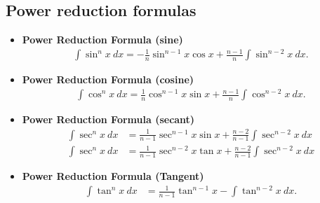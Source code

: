 \documentclass{report}
\begin{document}
    \bigbreak \noindent 
    \subsection*{Power reduction formulas}
    \bigbreak \noindent 
    \begin{thrm}
        \begin{itemize}
            \item \textbf{Power Reduction Formula (sine)}
                \begin{align*}
                    \int \sin^{n}{x}\ dx = -\frac{1}{n}\sin^{n-1}{x}\cos{x} + \frac{n-1}{n}\int \sin^{n-2}{x}\ dx
                .\end{align*}
            \item \textbf{Power Reduction Formula (cosine)}
                \begin{align*}
                    \int \cos^{n}{x}\ dx = \frac{1}{n}\cos^{n-1}{x}\sin{x} + \frac{n-1}{n}\int \cos^{n-2}{x}\ dx
                .\end{align*}
            \item \textbf{Power Reduction Formula (secant)}
            \begin{align*}
                \int \sec^{n}{x}\ dx &= \frac{1}{n-1}\sec^{n-1}{x}\sin{x}+\frac{n-2}{n-1}\int \sec^{n-2}{x}\ dx \\
                \int \sec^{n}{x}\ dx &= \frac{1}{n-1}\sec^{n-2}{x}\tan{x}+\frac{n-2}{n-1}\int \sec^{n-2}{x}\ dx
            \end{align*}
            \item \textbf{Power Reduction Formula (Tangent)}
                \begin{align*}
                    \int \tan^{n}{x}\ dx &= \frac{1}{n-1}\tan^{n-1}{x} - \int \tan^{n-2}{x}\ dx
                .\end{align*}
        \end{itemize}
    \end{thrm}
    

    \pagebreak 
\end{document}
